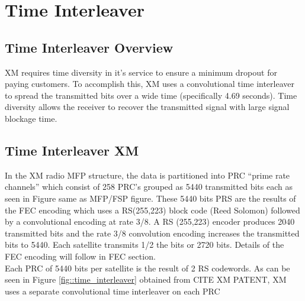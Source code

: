\documentclass[conference,onecolumn]{IEEEtran}
\begin{document}
\section{Time Interleaver}
\subsection{Time Interleaver Overview}
XM requires time diversity in it's service to ensure a minimum dropout for paying customers.  To accomplish this, XM uses a convolutional time interleaver to spread the transmitted bits over a wide time (specifically 4.69 seconds).  Time diversity allows the receiver to recover the transmitted signal with large signal blockage time. 

\subsection{Time Interleaver XM}
In the XM radio MFP structure, the data is partitioned into PRC ``prime rate channels'' which consist of 258 PRC's grouped as 5440 transmitted bits each as seen in Figure {same as MFP/FSP figure}.  These 5440 bits PRS are the results of the FEC encoding which uses a RS(255,223) block code (Reed Solomon) followed by a convolutional encoding at rate 3/8.  A RS (255,223) encoder produces 2040 transmitted bits and the rate 3/8 convolution encoding increases the transmitted bits to 5440.  Each satellite transmits 1/2 the bits or 2720 bits.  Details of the FEC encoding will follow in FEC section.\\
Each PRC of 5440 bits per satellite is the result of 2 RS codewords.  As can be seen in Figure \ref{fig::time_interleaver} obtained from {CITE XM PATENT}, XM uses a separate convolutional time interleaver on each PRC \\
\end{document}
